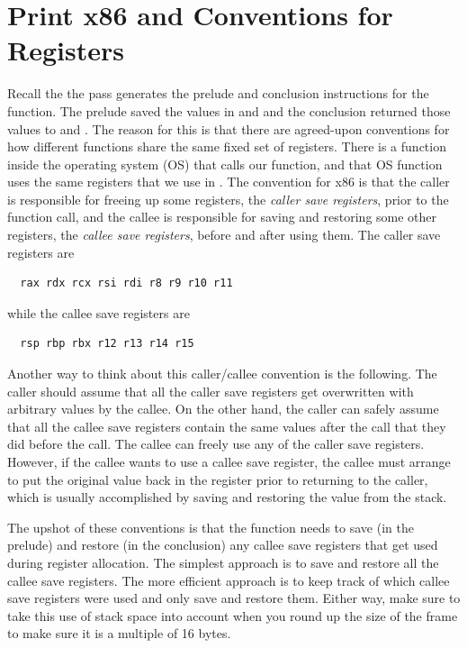 \documentclass[11pt]{book}
\begin{document}
\section{Print x86 and Conventions for Registers}
\label{sec:print-x86-reg-alloc}

Recall the the  pass generates the prelude and
conclusion instructions for the  function.  The prelude
saved the values in  and  and the conclusion
returned those values to  and . The reason for
this is that there are agreed-upon conventions for how different
functions share the same fixed set of registers. There is a function
inside the operating system (OS) that calls our  function,
and that OS function uses the same registers that we use in
. The convention for x86 is that the caller is responsible
for freeing up some registers, the \emph{caller save registers}, prior
to the function call, and the callee is responsible for saving and
restoring some other registers, the \emph{callee save registers},
before and after using them. The caller save registers are
\begin{lstlisting}
  rax rdx rcx rsi rdi r8 r9 r10 r11
\end{lstlisting}
while the callee save registers are 
\begin{lstlisting}
  rsp rbp rbx r12 r13 r14 r15
\end{lstlisting}
Another way to think about this caller/callee convention is the
following. The caller should assume that all the caller save registers
get overwritten with arbitrary values by the callee.  On the other
hand, the caller can safely assume that all the callee save registers
contain the same values after the call that they did before the call.
The callee can freely use any of the caller save registers.  However,
if the callee wants to use a callee save register, the callee must
arrange to put the original value back in the register prior to
returning to the caller, which is usually accomplished by saving and
restoring the value from the stack.

The upshot of these conventions is that the  function needs
to save (in the prelude) and restore (in the conclusion) any callee
save registers that get used during register allocation. The simplest
approach is to save and restore all the callee save registers. The
more efficient approach is to keep track of which callee save
registers were used and only save and restore them. Either way, make
sure to take this use of stack space into account when you round up
the size of the frame to make sure it is a multiple of 16 bytes.
\end{document}
